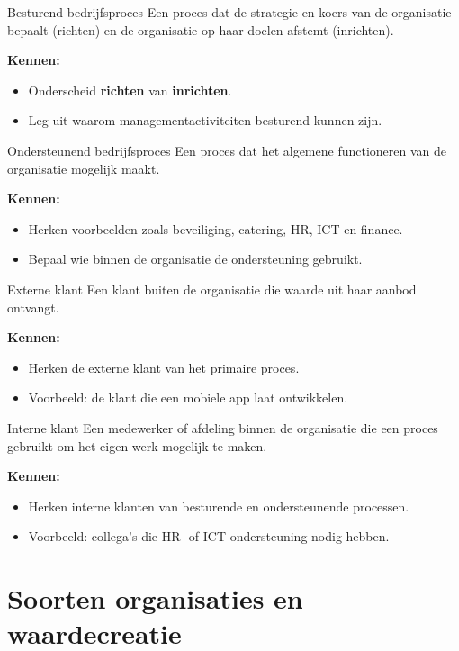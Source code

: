 \documentclass[11pt,a4paper]{article}
\newcommand{\kennen}{\par\smallskip\textbf{Kennen:}}
\begin{document}
\begin{definition}{Besturend bedrijfsproces}
Een proces dat de strategie en koers van de organisatie bepaalt (richten) en de
organisatie op haar doelen afstemt (inrichten).
\kennen
\begin{itemize}
  \item Onderscheid \textbf{richten} van \textbf{inrichten}.
  \item Leg uit waarom managementactiviteiten besturend kunnen zijn.
\end{itemize}
\end{definition}

\begin{definition}{Ondersteunend bedrijfsproces}
Een proces dat het algemene functioneren van de organisatie mogelijk maakt.
\kennen
\begin{itemize}
  \item Herken voorbeelden zoals beveiliging, catering, HR, ICT en finance.
  \item Bepaal wie binnen de organisatie de ondersteuning gebruikt.
\end{itemize}
\end{definition}

\begin{definition}{Externe klant}
Een klant buiten de organisatie die waarde uit haar aanbod ontvangt.
\kennen
\begin{itemize}
  \item Herken de externe klant van het primaire proces.
  \item Voorbeeld: de klant die een mobiele app laat ontwikkelen.
\end{itemize}
\end{definition}

\begin{definition}{Interne klant}
Een medewerker of afdeling binnen de organisatie die een proces gebruikt om
het eigen werk mogelijk te maken.
\kennen
\begin{itemize}
  \item Herken interne klanten van besturende en ondersteunende processen.
  \item Voorbeeld: collega's die HR- of ICT-ondersteuning nodig hebben.
\end{itemize}
\end{definition}

\section{Soorten organisaties en waardecreatie}
\end{document}
